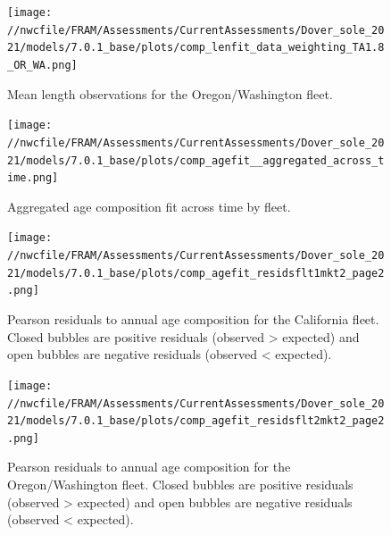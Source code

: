 \documentclass[11pt,
  english,
  a4paper,
]{article}
\begin{document}
\begin{figure}
\centering
\texttt{[image: //nwcfile/FRAM/Assessments/CurrentAssessments/Dover\_sole\_2021/models/7.0.1\_base/plots/comp\_lenfit\_data\_weighting\_TA1.8\_OR\_WA.png]}
\caption{Mean length observations for the Oregon/Washington fleet.\label{fig:orwa-mean-len}}
\end{figure}

\tagmcend\tagstructend


\begin{figure}
\centering
\texttt{[image: //nwcfile/FRAM/Assessments/CurrentAssessments/Dover\_sole\_2021/models/7.0.1\_base/plots/comp\_agefit\_\_aggregated\_across\_time.png]}
\caption{Aggregated age composition fit across time by fleet.\label{fig:agg-age-fits}}
\end{figure}

\tagmcend\tagstructend


\begin{figure}
\centering
\texttt{[image: //nwcfile/FRAM/Assessments/CurrentAssessments/Dover\_sole\_2021/models/7.0.1\_base/plots/comp\_agefit\_residsflt1mkt2\_page2.png]}
\caption{Pearson residuals to annual age composition for the California fleet. Closed bubbles are positive residuals (observed \textgreater{} expected) and open bubbles are negative residuals (observed \textless{} expected).\label{fig:ca-pearson-age}}
\end{figure}

\tagmcend\tagstructend


\begin{figure}
\centering
\texttt{[image: //nwcfile/FRAM/Assessments/CurrentAssessments/Dover\_sole\_2021/models/7.0.1\_base/plots/comp\_agefit\_residsflt2mkt2\_page2.png]}
\caption{Pearson residuals to annual age composition for the Oregon/Washington fleet. Closed bubbles are positive residuals (observed \textgreater{} expected) and open bubbles are negative residuals (observed \textless{} expected).\label{fig:orwa-pearson-age}}
\end{figure}
\end{document}
